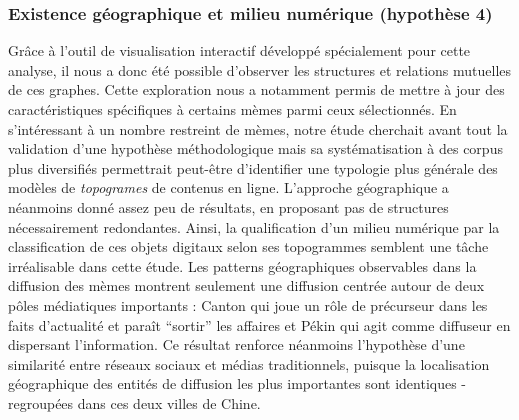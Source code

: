  
\subsubsection{Existence g\'eographique et milieu num\'erique (hypoth\`ese 4)}
 
Gr\^ace \`a l{\textquoteright}outil de visualisation interactif d\'evelopp\'e sp\'ecialement pour cette analyse, il nous a donc \'et\'e possible d{\textquoteright}observer les structures et relations mutuelles de ces graphes. Cette exploration nous a notamment permis de mettre \`a jour des caract\'eristiques sp\'ecifiques \`a certains m\`emes parmi ceux s\'electionn\'es. En s{\textquoteright}int\'eressant \`a un nombre restreint de m\`emes, notre \'etude cherchait avant tout la validation d{\textquoteright}une hypoth\`ese m\'ethodologique mais sa syst\'ematisation \`a des corpus plus diversifi\'es permettrait peut-\^etre d{\textquoteright}identifier une typologie plus g\'en\'erale des mod\`eles de \textit{topogrames} de contenus en ligne. L{\textquoteright}approche g\'eographique a n\'eanmoins donn\'e assez peu de r\'esultats, en proposant pas de structures n\'ecessairement redondantes. Ainsi, la qualification d{\textquoteright}un milieu num\'erique par la classification de ces objets digitaux selon ses topogrammes semblent une t\^ache irr\'ealisable dans cette \'etude. Les patterns g\'eographiques observables dans la diffusion des m\`emes montrent seulement une diffusion centr\'ee autour de deux p\^oles m\'ediatiques importants : Canton qui joue un r\^ole de pr\'ecurseur dans les faits d{\textquoteright}actualit\'e et para\^it {\textquotedblleft}sortir{\textquotedblright} les affaires et P\'ekin qui agit comme diffuseur en dispersant l{\textquoteright}information. Ce r\'esultat renforce n\'eanmoins l{\textquoteright}hypoth\`ese d{\textquoteright}une similarit\'e entre r\'eseaux sociaux et m\'edias traditionnels, puisque la localisation g\'eographique des entit\'es de diffusion les plus importantes sont identiques - regroup\'ees dans ces deux villes de Chine.


